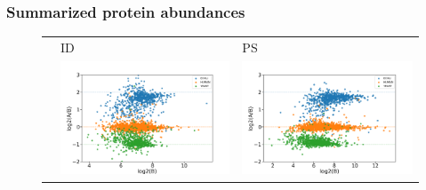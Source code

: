 \documentclass[11pt]{article}
\begin{document}
\subsubsection*{Summarized protein abundances}
\begin{figure}[hbt]
    \centering
    \setlength{\tabcolsep}{0pt}
    \begin{tabular}{   >{\centering\arraybackslash} m{3cm} V V}
                & ID & PS \\
        {} & \includegraphics[width=\linewidth]{../../result/report_plots_pipeline/scatter_ID_triqler.png}  
                & \includegraphics[width=\linewidth]{../../result/report_plots_pipeline/scatter_PS_triqler.png} \\ 

\end{tabular}
\end{figure}
\end{document}
